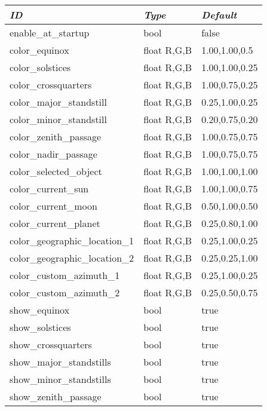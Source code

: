 \begin{longtabu} {l|l|l}\toprule
\emph{ID}                      &\emph{Type} & \emph{Default}  \\\midrule
enable\_at\_startup            &bool        & false           \\\midrule
color\_equinox                 &float R,G,B & 1.00,1.00,0.5   \\\midrule
color\_solstices               &float R,G,B & 1.00,1.00,0.25  \\\midrule
color\_crossquarters           &float R,G,B & 1.00,0.75,0.25  \\\midrule
color\_major\_standstill       &float R,G,B & 0.25,1.00,0.25  \\\midrule
color\_minor\_standstill       &float R,G,B & 0.20,0.75,0.20  \\\midrule
color\_zenith\_passage         &float R,G,B & 1.00,0.75,0.75  \\\midrule
color\_nadir\_passage          &float R,G,B & 1.00,0.75,0.75  \\\midrule
color\_selected\_object        &float R,G,B & 1.00,1.00,1.00  \\\midrule
color\_current\_sun            &float R,G,B & 1.00,1.00,0.75  \\\midrule
color\_current\_moon           &float R,G,B & 0.50,1.00,0.50  \\\midrule
color\_current\_planet         &float R,G,B & 0.25,0.80,1.00  \\\midrule
color\_geographic\_location\_1 &float R,G,B & 0.25,1.00,0.25  \\\midrule
color\_geographic\_location\_2 &float R,G,B & 0.25,0.25,1.00  \\\midrule
color\_custom\_azimuth\_1      &float R,G,B & 0.25,1.00,0.25  \\\midrule
color\_custom\_azimuth\_2      &float R,G,B & 0.25,0.50,0.75  \\\midrule
show\_equinox                  &bool        & true  \\\midrule
show\_solstices                &bool        & true  \\\midrule
show\_crossquarters            &bool        & true  \\\midrule
show\_major\_standstills       &bool        & true  \\\midrule
show\_minor\_standstills       &bool        & true  \\\midrule
show\_zenith\_passage          &bool        & true  \\\midrule

\end{longtabu}
